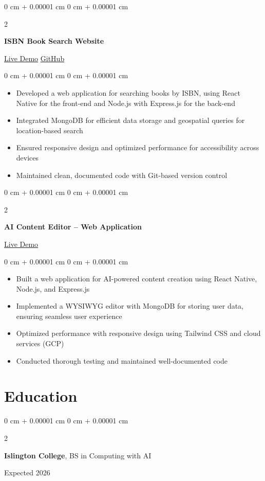 \documentclass[10pt, letterpaper]{article}
\newenvironment{highlights}{
    \begin{itemize}[
        topsep=0.10 cm,
        parsep=0.10 cm,
        partopsep=0pt,
        itemsep=0pt,
        leftmargin=0 cm + 10pt
    ]
}{
    \end{itemize}
} %
\newenvironment{onecolentry}{
    \begin{adjustwidth}{
        0 cm + 0.00001 cm
    }{
        0 cm + 0.00001 cm
    }
}{
    \end{adjustwidth}
} %
\newenvironment{twocolentry}[2][]{
    \onecolentry
    \def\secondColumn{#2}
    \setcolumnwidth{\fill, 4.5 cm}
    \begin{paracol}{2}
}{
    \switchcolumn \raggedleft \secondColumn
    \end{paracol}
    \endonecolentry
} %
\begin{document}
    \vspace{0.2 cm}

    \begin{twocolentry}{
        \href{https://isbn-library.vercel.app/}{Live Demo} \AND \href{https://github.com/Prashidha0O1/isbn-library}{GitHub}
    }
        \textbf{ISBN Book Search Website}
    \end{twocolentry}
    \vspace{0.10 cm}
    \begin{onecolentry}
        \begin{highlights}
            \item Developed a web application for searching books by ISBN, using React Native for the front-end and Node.js with Express.js for the back-end
            \item Integrated MongoDB for efficient data storage and geospatial queries for location-based search
            \item Ensured responsive design and optimized performance for accessibility across devices
            \item Maintained clean, documented code with Git-based version control
        \end{highlights}
    \end{onecolentry}

    \vspace{0.2 cm}

    \begin{twocolentry}{
        \href{https://mini-lucid.vercel.app/}{Live Demo}
    }
        \textbf{AI Content Editor -- Web Application}
    \end{twocolentry}
    \vspace{0.10 cm}
    \begin{onecolentry}
        \begin{highlights}
            \item Built a web application for AI-powered content creation using React Native, Node.js, and Express.js
            \item Implemented a WYSIWYG editor with MongoDB for storing user data, ensuring seamless user experience
            \item Optimized performance with responsive design using Tailwind CSS and cloud services (GCP)
            \item Conducted thorough testing and maintained well-documented code
        \end{highlights}
    \end{onecolentry}

    \section{Education}
    \begin{twocolentry}{Expected 2026}
        \textbf{Islington College}, BS in Computing with AI
    \end{twocolentry}
\end{document}
